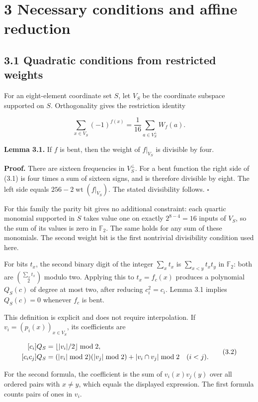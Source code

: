 \documentclass[11pt,a4paper]{article}
\begin{document}
\section*{3 Necessary conditions and affine reduction}

\subsection*{3.1 Quadratic conditions from restricted weights}

For an eight-element coordinate set $S$, let $V_S$ be the coordinate subspace supported on $S$. Orthogonality gives the restriction identity

\[
\sum_{x\in V_S}(-1)^{f(x)}=\frac1{16}\sum_{a\in V_S^\perp}W_f(a). \tag{3.1}
\]

\textbf{Lemma 3.1.} If $f$ is bent, then the weight of $f|_{V_S}$ is divisible by four.

\textbf{Proof.} There are sixteen frequencies in $V_S^\perp$. For a bent function the right side of (3.1) is four times a sum of sixteen signs, and is therefore divisible by eight. The left side equals $256-2\operatorname{wt}(f|_{V_S})$. The stated divisibility follows. \hfill$\square$

For this family the parity bit gives no additional constraint: each quartic monomial supported in $S$ takes value one on exactly $2^{8-4}=16$ inputs of $V_S$, so the sum of its values is zero in $\mathbb F_2$. The same holds for any sum of these monomials. The second weight bit is the first nontrivial divisibility condition used here.

For bits $t_x$, the second binary digit of the integer $\sum_x t_x$ is
$\sum_{x<y}t_xt_y$ in $\mathbb F_2$: both are $\binom{\sum_x t_x}{2}$ modulo two. Applying this to $t_x=f_c(x)$ produces a polynomial $Q_S(c)$ of degree at most two, after reducing $c_i^2=c_i$. Lemma 3.1 implies $Q_S(c)=0$ whenever $f_c$ is bent.

This definition is explicit and does not require interpolation. If $v_i=(p_i(x))_{x\in V_S}$, its coefficients are

\[
\begin{aligned}\relax[c_i]Q_S&=\left\lfloor |v_i|/2\right\rfloor\bmod2,\\\relax[c_ic_j]Q_S&=(|v_i|\bmod2)(|v_j|\bmod2)+|v_i\cap v_j|\bmod2\quad(i<j).\end{aligned} \tag{3.2}
\]

For the second formula, the coefficient is the sum of $v_i(x)v_j(y)$ over all ordered pairs with $x\ne y$, which equals the displayed expression. The first formula counts pairs of ones in $v_i$.
\end{document}
